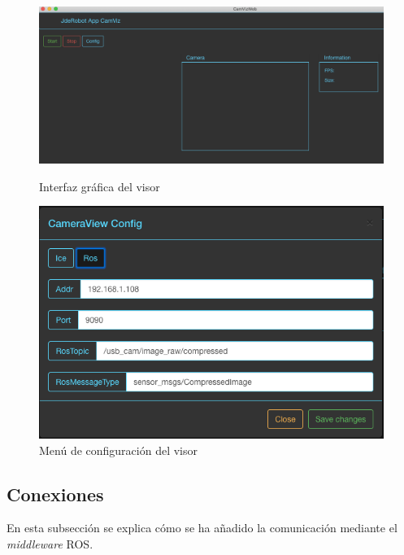 \begin{figure}
\centering
  \begin{minipage}{0.45\textwidth}
    \centering
    \includegraphics[width=1\textwidth]{figures/interfazcamviz.png}
    \caption{Interfaz gráfica del visor}
    \label{fig.iterfazcamviz}
  \end{minipage}%
  \hspace{5mm}
  \begin{minipage}{0.45\textwidth}
    \centering
    \includegraphics[width=1\textwidth]{figures/configuracioncamviz.png}
    \caption{Menú de configuración del visor}
    \label{fig.configuracioncamviz}
  \end{minipage}
\end{figure}

\subsection{Conexiones}

En esta subsección se explica cómo se ha añadido la comunicación mediante el \textit{middleware} ROS.

